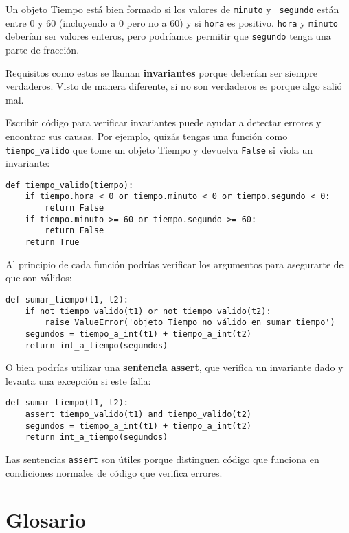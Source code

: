 \documentclass[10pt]{book}
\begin{document}
Un objeto Tiempo está bien formado si los valores de {\tt minuto} y {\tt
segundo} están entre 0 y 60 (incluyendo a 0 pero no a 60) y si
{\tt hora} es positivo.  {\tt hora} y {\tt minuto} deberían ser
valores enteros, pero podríamos permitir que {\tt segundo} tenga una
parte de fracción.

Requisitos como estos se llaman {\bf invariantes} porque
deberían ser siempre verdaderos.  Visto de manera diferente, si no
son verdaderos es porque algo salió mal.

Escribir código para verificar invariantes puede ayudar a detectar errores
y encontrar sus causas.  Por ejemplo, quizás tengas una función
como \verb"tiempo_valido" que tome un objeto Tiempo y devuelva
{\tt False} si viola un invariante:

\begin{verbatim}
def tiempo_valido(tiempo):
    if tiempo.hora < 0 or tiempo.minuto < 0 or tiempo.segundo < 0:
        return False
    if tiempo.minuto >= 60 or tiempo.segundo >= 60:
        return False
    return True
\end{verbatim}
%
Al principio de cada función podrías verificar los
argumentos para asegurarte de que son válidos:

\begin{verbatim}
def sumar_tiempo(t1, t2):
    if not tiempo_valido(t1) or not tiempo_valido(t2):
        raise ValueError('objeto Tiempo no válido en sumar_tiempo')
    segundos = tiempo_a_int(t1) + tiempo_a_int(t2)
    return int_a_tiempo(segundos)
\end{verbatim}
%
O bien podrías utilizar una {\bf sentencia assert}, que verifica un invariante dado
y levanta una excepción si este falla:

\begin{verbatim}
def sumar_tiempo(t1, t2):
    assert tiempo_valido(t1) and tiempo_valido(t2)
    segundos = tiempo_a_int(t1) + tiempo_a_int(t2)
    return int_a_tiempo(segundos)
\end{verbatim}
%
Las sentencias {\tt assert} son útiles porque distinguen
código que funciona en condiciones normales de código
que verifica errores.


\section{Glosario}
\end{document}
